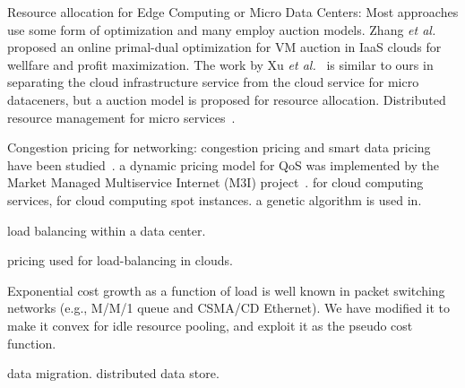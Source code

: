 
Resource allocation for Edge Computing or Micro Data Centers:
Most approaches use some form of optimization and many employ auction
models.
Zhang {\em et al.}~\cite{Xu2017-zenith,Zhang2017-VMauction}
proposed an online primal-dual optimization for VM auction in IaaS
clouds for wellfare and profit maximization.
The work by Xu {\em et al.}~\cite{Xu2017-zenith} is similar to ours in
separating the cloud infrastructure service from the cloud service for
micro dataceners, but a auction model is proposed for resource
allocation.
Distributed resource management for micro services~\cite{Suresh-SOA-SOCC2017}.

Congestion pricing for networking:
congestion pricing and smart data pricing have been
studied~\cite{pricing-internet-1994,gibbens1999resource,Henderson2001,Sen-2013}.
a dynamic pricing model for QoS was implemented by the
Market Managed Multiservice Internet (M3I) project~\cite{Briscoe2003-M3I}.
for cloud computing services\cite{Wang-hotcloud2010,Kilcioglu-SIGMETRICS2015},
for cloud computing spot instances\cite{Song-INFOCOM2017}.
a genetic algorithm is used in\cite{Macias-SAC2011}.

load balancing within a data center\cite{Rikhtegar2021BiTEAD}.

pricing used for load-balancing in clouds\cite{Song-2014,Ren-2017}.

Exponential cost growth as a function of load is well known in packet
switching networks (e.g., M/M/1 queue and CSMA/CD Ethernet).
We have modified it to make it convex for idle resource pooling, and
exploit it as the pseudo cost function.

data migration\cite{Pu2015-geodistdata}.
distributed data store\cite{Shima2012,Tahoe-2008}.


